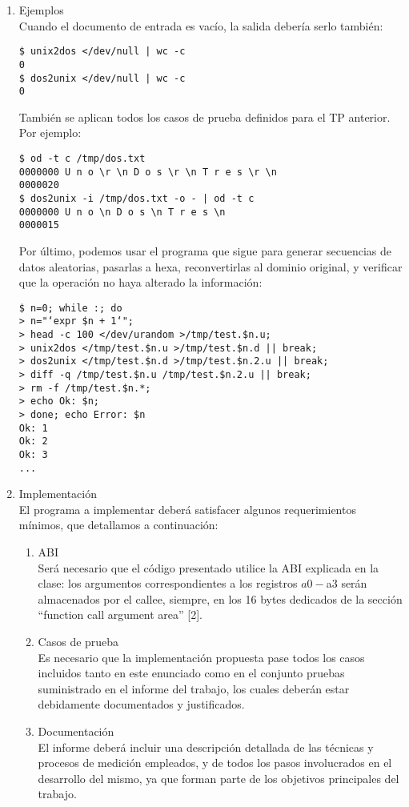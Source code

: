 \documentclass[a4paper,11pt]{article}
\begin{document}
\begin{enumerate}
\item Ejemplos \\
Cuando el documento de entrada es vac\'io, la salida deber\'ia serlo tambi\'en:
\begin{verbatim}
$ unix2dos </dev/null | wc -c
0
$ dos2unix </dev/null | wc -c
0
\end{verbatim}
Tambi\'en se aplican todos los casos de prueba definidos para el TP anterior.
Por ejemplo:
\begin{verbatim}
$ od -t c /tmp/dos.txt
0000000 U n o \r \n D o s \r \n T r e s \r \n
0000020
$ dos2unix -i /tmp/dos.txt -o - | od -t c
0000000 U n o \n D o s \n T r e s \n
0000015
\end{verbatim}
Por \'ultimo, podemos usar el programa que sigue para generar secuencias de
datos aleatorias, pasarlas a hexa, reconvertirlas al dominio original, y verificar
que la operaci\'on no haya alterado la informaci\'on:
\begin{verbatim}
$ n=0; while :; do
> n="‘expr $n + 1‘";
> head -c 100 </dev/urandom >/tmp/test.$n.u;
> unix2dos </tmp/test.$n.u >/tmp/test.$n.d || break;
> dos2unix </tmp/test.$n.d >/tmp/test.$n.2.u || break;
> diff -q /tmp/test.$n.u /tmp/test.$n.2.u || break;
> rm -f /tmp/test.$n.*;
> echo Ok: $n;
> done; echo Error: $n
Ok: 1
Ok: 2
Ok: 3
...
\end{verbatim}

\item Implementaci\'on \\
El programa a implementar deber\'a satisfacer algunos requerimientos m\'inimos,
que detallamos a continuaci\'on:


\begin{enumerate}
\item ABI \\
Ser\'a necesario que el c\'odigo presentado utilice la ABI explicada en la clase:
los argumentos correspondientes a los registros $a0-$a3 ser\'an almacenados
por el callee, siempre, en los 16 bytes dedicados de la secci\'on “function call
argument area” [2].

\item Casos de prueba\\
Es necesario que la implementaci\'on propuesta pase todos los casos incluidos
tanto en este enunciado como en el conjunto pruebas suministrado en el
informe del trabajo, los cuales deber\'an estar debidamente documentados y
justificados.

\item Documentaci\'on \\
El informe deber\'a incluir una descripci\'on detallada de las t\'ecnicas y procesos
de medici\'on empleados, y de todos los pasos involucrados en el desarrollo
del mismo, ya que forman parte de los objetivos principales del trabajo.
\end{enumerate}


\end{enumerate}
\end{document}
